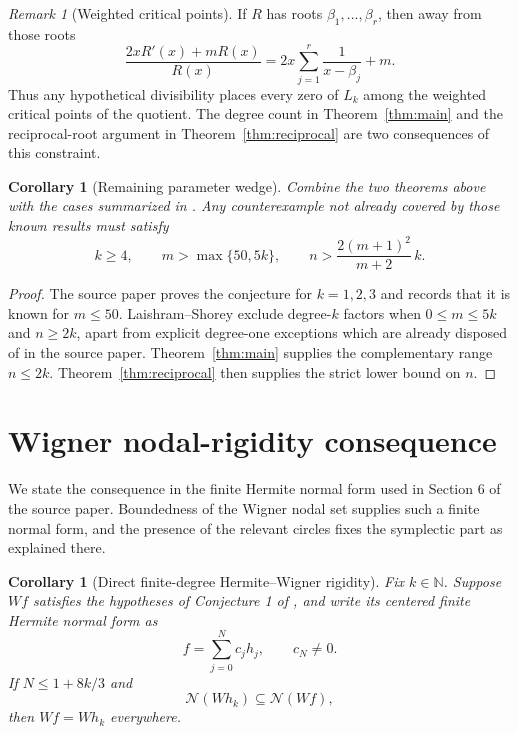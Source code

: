 \documentclass[11pt]{article}
\newtheorem{corollary}[theorem]{Corollary}
\theoremstyle{remark}
\newtheorem{remark}[theorem]{Remark}
\begin{document}
\begin{remark}[Weighted critical points]
If $R$ has roots $\beta_1,\ldots,\beta_r$, then away from those roots
\[
 \frac{2xR'(x)+mR(x)}{R(x)}
   =2x\sum_{j=1}^{r}\frac1{x-\beta_j}+m.
\]
Thus any hypothetical divisibility places every zero of $L_k$ among the
weighted critical points of the quotient.  The degree count in
Theorem~\ref{thm:main} and the reciprocal-root argument in
Theorem~\ref{thm:reciprocal} are two consequences of this constraint.
\end{remark}

\begin{corollary}[Remaining parameter wedge]\label{cor:wedge}
Combine the two theorems above with the cases summarized in
\cite{ACDP,LS}.  Any counterexample not already covered by those known
results must satisfy
\[
 k\geq4,\qquad m>\max\{50,5k\},\qquad
 n>\frac{2(m+1)^2}{m+2}\,k.
\]
\end{corollary}

\begin{proof}
The source paper proves the conjecture for $k=1,2,3$ and records that it is
known for $m\leq50$.  Laishram--Shorey exclude degree-$k$ factors when
$0\leq m\leq5k$ and $n\geq2k$, apart from explicit degree-one exceptions
which are already disposed of in the source paper.  Theorem~\ref{thm:main}
supplies the complementary range $n\leq2k$.  Theorem~\ref{thm:reciprocal}
then supplies the strict lower bound on $n$.
\end{proof}

\section{Wigner nodal-rigidity consequence}

We state the consequence in the finite Hermite normal form used in Section 6
of the source paper.  Boundedness of the Wigner nodal set supplies such a
finite normal form, and the presence of the relevant circles fixes the
symplectic part as explained there.

\begin{corollary}[Direct finite-degree Hermite--Wigner rigidity]
\label{cor:wigner-direct}
Fix $k\in\mathbb N$.  Suppose $Wf$ satisfies the hypotheses of Conjecture 1
of \cite{ACDP}, and write its centered finite Hermite normal form as
\[
                 f=\sum_{j=0}^{N}c_jh_j,
                 \qquad c_N\neq0.
\]
If $N\leq1+8k/3$ and
\[
             \mathcal N(Wh_k)\subseteq\mathcal N(Wf),
\]
then $Wf=Wh_k$ everywhere.
\end{corollary}
\end{document}
